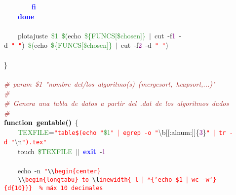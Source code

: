 \mbox{}\ \ \ \ \ \ \ \ \textbf{\textcolor{Blue}{fi}} \\
\mbox{}\ \ \ \ \textbf{\textcolor{Blue}{done}} \\
\mbox{} \\
\mbox{}\ \ \ \ plotajuste\ \textcolor{ForestGreen}{\$1}\ \textcolor{ForestGreen}{\$(}echo\ \textcolor{ForestGreen}{\$\{FUNCS[\$chosen]\}}\ \textcolor{BrickRed}{$|$}\ cut\ -f\textcolor{Purple}{1}\ -d\ \texttt{\textcolor{Red}{"{}\ "{}}}\textcolor{BrickRed}{)}\ \textcolor{ForestGreen}{\$(}echo\ \textcolor{ForestGreen}{\$\{FUNCS[\$chosen]\}}\ \textcolor{BrickRed}{$|$}\ cut\ -f\textcolor{Purple}{2}\ -d\ \texttt{\textcolor{Red}{"{}\ "{}}}\textcolor{BrickRed}{)} \\
\mbox{} \\
\mbox{}\} \\
\mbox{} \\
\mbox{}\textit{\textcolor{Brown}{\#\ param\ \$1\ "{}nombre\ del/los\ algoritmo(s)\ (mergesort,\ heapsort,...)"{}}} \\
\mbox{}\textit{\textcolor{Brown}{\#\ }} \\
\mbox{}\textit{\textcolor{Brown}{\#\ Genera\ una\ tabla\ de\ datos\ a\ partir\ del\ .dat\ de\ los\ algoritmos\ dados\ }} \\
\mbox{}\textit{\textcolor{Brown}{\#}} \\
\mbox{}\textbf{\textcolor{Black}{function\ gentable()}}\ \{ \\
\mbox{}\ \ \ \ \textcolor{ForestGreen}{TEXFILE}\textcolor{BrickRed}{=}\texttt{\textcolor{Red}{"{}table\$(echo\ "{}}}\textcolor{ForestGreen}{\$1}\texttt{\textcolor{Red}{"{}\ $|$\ egrep\ -o\ "{}}}\textcolor{BrickRed}{\textbackslash{}}b\textcolor{BrickRed}{[[:}alnum\textcolor{BrickRed}{:]]}\{\textcolor{Purple}{3}\}\texttt{\textcolor{Red}{"{}\ $|$\ tr\ -d\ "{}}}\textcolor{BrickRed}{\textbackslash{}}n\texttt{\textcolor{Red}{"{}).tex"{}}} \\
\mbox{}\ \ \ \ touch\ \textcolor{ForestGreen}{\$TEXFILE}\ \textcolor{BrickRed}{$|$$|$}\ \textbf{\textcolor{Blue}{exit}}\ -\textcolor{Purple}{1} \\
\mbox{} \\
\mbox{}\ \ \ \ echo\ -n\ \texttt{\textcolor{Red}{"{}}}\texttt{\textcolor{CarnationPink}{\textbackslash{}\textbackslash{}}}\texttt{\textcolor{Red}{begin\{center\}}} \\
\mbox{}\texttt{\textcolor{Red}{\ \ \ \ }}\texttt{\textcolor{CarnationPink}{\textbackslash{}\textbackslash{}}}\texttt{\textcolor{Red}{begin\{longtabu\}\ to\ }}\texttt{\textcolor{CarnationPink}{\textbackslash{}l}}\texttt{\textcolor{Red}{inewidth\{\ l\ $|$\ *\{`echo\ \$1\ $|$\ wc\ -w`\}\{d\{10\}\}\}\ \ \%\ máx\ 10\ decimales}} \\
